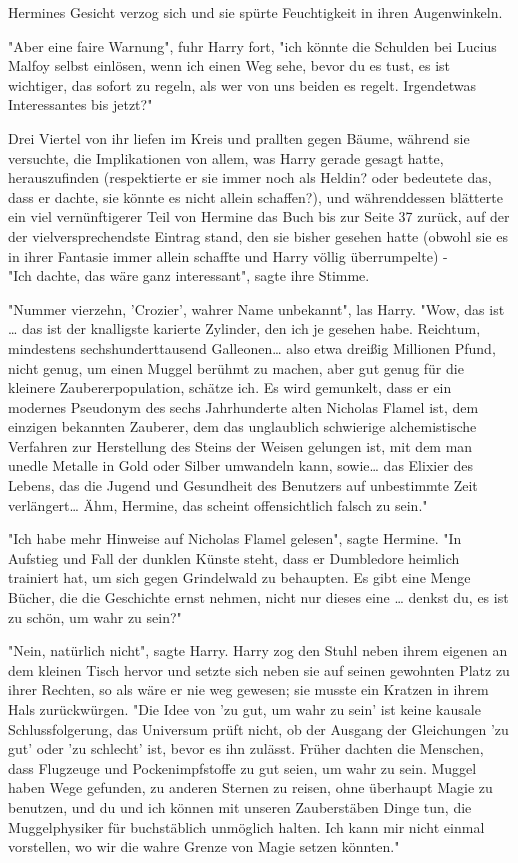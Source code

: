 {Hermines Gesicht verzog sich und sie spürte Feuchtigkeit in ihren Augenwinkeln.

"Aber eine faire Warnung", fuhr Harry fort, "ich könnte die Schulden bei Lucius Malfoy selbst einlösen, wenn ich einen Weg sehe, bevor du es tust, es ist wichtiger, das sofort zu regeln, als wer von uns beiden es regelt. Irgendetwas Interessantes bis jetzt?"

Drei Viertel von ihr liefen im Kreis und prallten gegen Bäume, während sie versuchte, die Implikationen von allem, was Harry gerade gesagt hatte, herauszufinden (respektierte er sie immer noch als Heldin? oder bedeutete das, dass er dachte, sie könnte es nicht allein schaffen?), und währenddessen blätterte ein viel vernünftigerer Teil von Hermine das Buch bis zur Seite 37 zurück, auf der der vielversprechendste Eintrag stand, den sie bisher gesehen hatte (obwohl sie es in ihrer Fantasie immer allein schaffte und Harry völlig überrumpelte) -\\ "Ich dachte, das wäre ganz interessant", sagte ihre Stimme.

"Nummer vierzehn, 'Crozier', wahrer Name unbekannt", las Harry. "Wow, das ist … das ist der knalligste karierte Zylinder, den ich je gesehen habe. Reichtum, mindestens sechshunderttausend Galleonen… also etwa dreißig Millionen Pfund, nicht genug, um einen Muggel berühmt zu machen, aber gut genug für die kleinere Zaubererpopulation, schätze ich. Es wird gemunkelt, dass er ein modernes Pseudonym des sechs Jahrhunderte alten Nicholas Flamel ist, dem einzigen bekannten Zauberer, dem das unglaublich schwierige alchemistische Verfahren zur Herstellung des Steins der Weisen gelungen ist, mit dem man unedle Metalle in Gold oder Silber umwandeln kann, sowie… das Elixier des Lebens, das die Jugend und Gesundheit des Benutzers auf unbestimmte Zeit verlängert… Ähm, Hermine, das scheint offensichtlich falsch zu sein."

"Ich habe mehr Hinweise auf Nicholas Flamel gelesen", sagte Hermine. "In Aufstieg und Fall der dunklen Künste steht, dass er Dumbledore heimlich trainiert hat, um sich gegen Grindelwald zu behaupten. Es gibt eine Menge Bücher, die die Geschichte ernst nehmen, nicht nur dieses eine … denkst du, es ist zu schön, um wahr zu sein?"

"Nein, natürlich nicht", sagte Harry. Harry zog den Stuhl neben ihrem eigenen an dem kleinen Tisch hervor und setzte sich neben sie auf seinen gewohnten Platz zu ihrer Rechten, so als wäre er nie weg gewesen; sie musste ein Kratzen in ihrem Hals zurückwürgen. "Die Idee von 'zu gut, um wahr zu sein' ist keine kausale Schlussfolgerung, das Universum prüft nicht, ob der Ausgang der Gleichungen 'zu gut' oder 'zu schlecht' ist, bevor es ihn zulässt. Früher dachten die Menschen, dass Flugzeuge und Pockenimpfstoffe zu gut seien, um wahr zu sein. Muggel haben Wege gefunden, zu anderen Sternen zu reisen, ohne überhaupt Magie zu benutzen, und du und ich können mit unseren Zauberstäben Dinge tun, die Muggelphysiker für buchstäblich unmöglich halten. Ich kann mir nicht einmal vorstellen, wo wir die wahre Grenze von Magie setzen könnten."

}
